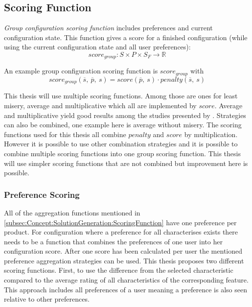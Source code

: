 \subsection{Scoring Function}
\label{subsec:Concept:SolutionGeneration:ScoringFunction}

\emph{Group configuration scoring function} includes preferences and current configuration state. This function gives a score for a finished configuration (while using the current configuration state and all user preferences):
\begin{equation}
    score_{group}: S \times P \times S_F \to \mathbb{R}
\end{equation}

An example group configuration scoring function is $score_{group}$ with
\begin{equation}
    score_{group}(\overline{s},\ \overline{p},\ s) = score(\overline{p},\ s) \cdot penalty(\overline{s},\ s)
\end{equation}

This thesis will use multiple scoring functions. Among those are ones for least misery, average and multiplicative which all are implemented by $score$. Average and multiplicative yield good results among the studies presented by \citeauthor{Masthoff2015} \cite{Masthoff2015}. Strategies can also be combined, one example here is average without misery. The scoring functions used for this thesis all combine $penalty$ and $score$ by multiplication. However it is possible to use other combination strategies and it is possible to combine multiple scoring functions into one group scoring function. This thesis will use simpler scoring functions that are not combined but improvement here is possible.

\subsubsection{Preference Scoring}


All of the aggregation functions mentioned in \autoref{subsec:Concept:SolutionGeneration:ScoringFunction} have one preference per product. For configuration where a preference for all characterises exists there needs to be a function that combines the preferences of one user into her configuration score. After one score has been calculated per user the mentioned preference aggregation strategies can be used.
This thesis proposes two different scoring functions. First, to use the difference from the selected characteristic compared to the average rating of all characteristics of the corresponding feature. This approach includes all preferences of a user meaning a preference is also seen relative to other preferences.

